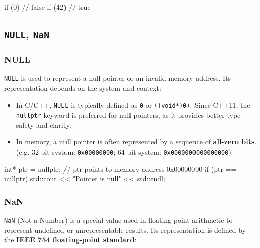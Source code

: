 \vspace{-0.5em}

\begin{codeblock}[language=C++, numbers=none]
if (0)    // false
if (42)   // true
\end{codeblock}

\subsection{\texttt{NULL}, \texttt{NaN}}

\subsubsection{NULL}

\texttt{NULL} is used to represent a null pointer or an invalid memory address. Its representation depends on the system and context:

\begin{itemize}
    \item In C/C++, \texttt{NULL} is typically defined as \texttt{0} or \texttt{((void*)0)}. Since C++11, the \texttt{nullptr} keyword is preferred for null pointers, as it provides better type safety and clarity.
    \item In memory, a null pointer is often represented by a sequence of \textbf{all-zero bits}. (e.g. 32-bit system: \texttt{0x00000000}; 64-bit system: \texttt{0x0000000000000000})
\end{itemize}


\begin{exampleblock}
    \begin{codeblock}[language=C++]
int* ptr = nullptr; // ptr points to memory address 0x00000000
if (ptr == nullptr) {
    std::cout << "Pointer is null" << std::endl;
}
    \end{codeblock}
\end{exampleblock}

\subsubsection{NaN}

\texttt{NaN} (Not a Number) is a special value used in floating-point arithmetic to represent undefined or unrepresentable results. Its representation is defined by the \textbf{IEEE 754 floating-point standard}:


